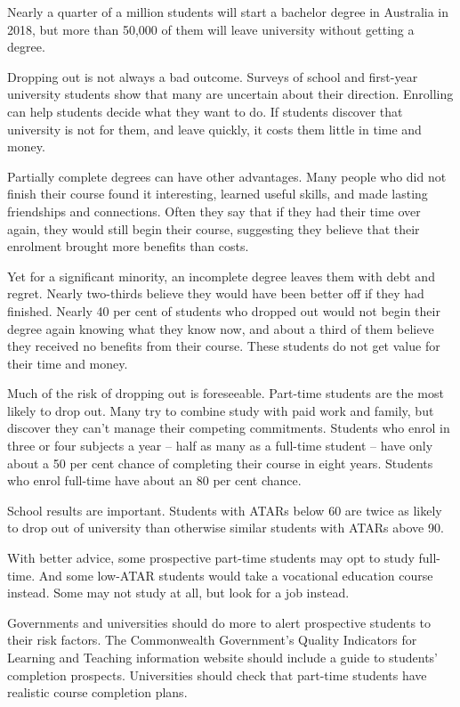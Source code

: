 \begin{overview}


Nearly a quarter of a million students will start a bachelor degree in Australia in 2018, but more than 50,000 of them will leave university without getting a degree.

Dropping out is not always a bad outcome. Surveys of school and first-year university students show that many are uncertain about their direction. Enrolling can help students decide what they want to do. If students discover that university is not for them, and leave quickly, it costs them little in time and money.

Partially complete degrees can have other advantages. Many people who did not finish their course found it interesting, learned useful skills, and made lasting friendships and connections. Often they say that if they had their time over again, they would still begin their course, suggesting they believe that their enrolment brought more benefits than costs.

Yet for a significant minority, an incomplete degree leaves them with debt and regret. Nearly two-thirds believe they would have been better off if they had finished. Nearly 40 per cent of students who dropped out would not begin their degree again knowing what they know now, and about a third of them believe they received no benefits from their course. These students do not get value for their time and money.

Much of the risk of dropping out is foreseeable. Part-time students are the most likely to drop out. Many try to combine study with paid work and family, but discover they can’t manage their competing commitments. Students who enrol in three or four subjects a year -- half as many as a full-time student -- have only about a 50 per cent chance of completing their course in eight years. Students who enrol full-time have about an 80 per cent chance. 

School results are important. Students with ATARs below 60 are twice as likely to drop out of university than otherwise similar students with ATARs above 90.

With better advice, some prospective part-time students may opt to study full-time. And some low-ATAR students would take a vocational education course instead. Some may not study at all, but look for a job instead. 

Governments and universities should do more to alert prospective students to their risk factors. The Commonwealth Government’s Quality Indicators for Learning and Teaching information website should include a guide to students’ completion prospects. Universities should check that part-time students have realistic course completion plans. 


\end{overview}
